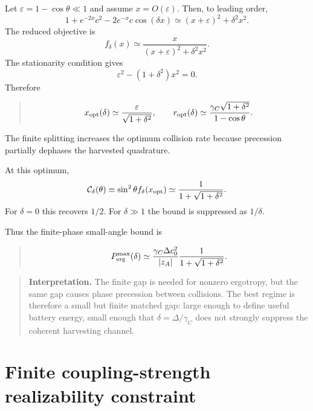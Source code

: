 \documentclass[11pt,a4paper]{article}
\newcommand{\eps}{\varepsilon}
\newenvironment{resultbox}{\begin{quote}\small}{\end{quote}}
\newenvironment{notebox}{\begin{quote}\small}{\end{quote}}
\begin{document}
Let $\eps=1-\cos\theta\ll1$ and assume $x=O(\eps)$. Then, to leading order,
\begin{equation}
1+e^{-2x}c^2-2e^{-x}c\cos(\delta x)
\simeq (x+\eps)^2+\delta^2x^2.
\end{equation}
The reduced objective is
\begin{equation}
f_\delta(x)\simeq \frac{x}{(x+\eps)^2+\delta^2x^2}.
\end{equation}
The stationarity condition gives
\begin{equation}
\eps^2-(1+\delta^2)x^2=0.
\end{equation}
Therefore
\begin{resultbox}
\begin{equation}
x_{\rm opt}(\delta)\simeq\frac{\eps}{\sqrt{1+\delta^2}},
\qquad
r_{\rm opt}(\delta)\simeq\frac{\gamma_C\sqrt{1+\delta^2}}{1-\cos\theta}.
\end{equation}
\end{resultbox}
The finite splitting increases the optimum collision rate because precession partially dephases the harvested quadrature.

At this optimum,
\begin{equation}
\mathcal C_\delta(\theta)\equiv \sin^2\theta f_\delta(x_{\rm opt})
\simeq \frac{1}{1+\sqrt{1+\delta^2}}.
\end{equation}
For $\delta=0$ this recovers $1/2$. For $\delta\gg1$ the bound is suppressed as $1/\delta$.

Thus the finite-phase small-angle bound is
\begin{resultbox}
\begin{equation}
P_{\rm erg}^{\rm max}(\delta)
\simeq
\frac{\gamma_C\Delta c_0^2}{|z_A|}\frac{1}{1+\sqrt{1+\delta^2}}.
\end{equation}
\end{resultbox}

\begin{notebox}
\textbf{Interpretation.} The finite gap is needed for nonzero ergotropy, but the same gap causes phase precession between collisions. The best regime is therefore a small but finite matched gap: large enough to define useful battery energy, small enough that $\delta=\Delta/\gamma_C$ does not strongly suppress the coherent harvesting channel.
\end{notebox}

\section{Finite coupling-strength realizability constraint}
\end{document}
